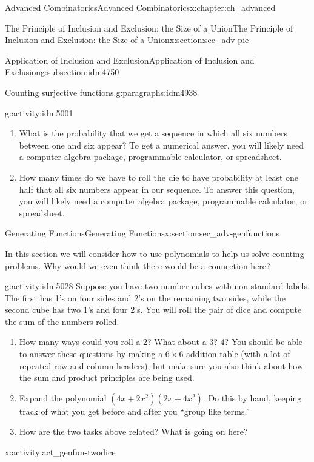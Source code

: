 \documentclass[oneside,10pt,]{book}
\numberwithin{equation}{chapter}
\begin{document}
\begin{chapterptx}{Advanced Combinatorics}{}{Advanced Combinatorics}{}{}{x:chapter:ch_advanced}
\begin{sectionptx}{The Principle of Inclusion and Exclusion: the Size of a Union}{}{The Principle of Inclusion and Exclusion: the Size of a Union}{}{}{x:section:sec_adv-pie}
\begin{subsectionptx}{Application of Inclusion and Exclusion}{}{Application of Inclusion and Exclusion}{}{}{g:subsection:idm4750}
\begin{paragraphs}{Counting surjective functions.}{g:paragraphs:idm4938}
\begin{activity}{}{g:activity:idm5001}
\begin{enumerate}[font=\bfseries,label=(\alph*),ref=\alph*]
\item{}What is the probability that we get a sequence in which all six numbers between one and six appear? To get a numerical answer, you will likely need a computer algebra package, programmable calculator, or spreadsheet.%
\item{}How many times do we have to roll the die to have probability at least one half that all six numbers appear in our sequence. To answer this question, you will likely need a computer algebra package, programmable calculator, or spreadsheet.%
\end{enumerate}
\end{activity}
\end{paragraphs}%
\end{subsectionptx}
\end{sectionptx}
%
%
\typeout{************************************************}
\typeout{************************************************}
%
\begin{sectionptx}{Generating Functions}{}{Generating Functions}{}{}{x:section:sec_adv-genfunctions}
\begin{introduction}{}%
In this section we will consider how to use polynomials to help us solve counting problems.  Why would we even think there would be a connection here?%
\begin{activity}{}{g:activity:idm5028}%
Suppose you have two number cubes with non-standard labels.  The first has 1's on four sides and 2's on the remaining two sides, while the second cube has two 1's and four 2's. You will roll the pair of dice and compute the sum of the numbers rolled.%
\begin{enumerate}[font=\bfseries,label=(\alph*),ref=\alph*]
\item{}How many ways could you roll a 2?  What about a 3?  4?  You should be able to answer these questions by making a \(6\times 6\) addition table (with a lot of repeated row and column headers), but make sure you also think about how the sum and product principles are being used.%
\item{}Expand the polynomial \((4x + 2x^2)(2x + 4x^2)\).  Do this by hand, keeping track of what you get before and after you ``group like terms.''%
\item{}How are the two tasks above related?  What is going on here?%
\end{enumerate}
\end{activity}
\begin{activity}{}{x:activity:act_genfun-twodice}%

\end{activity}
\end{introduction}
\end{sectionptx}
\end{chapterptx}
\end{document}
